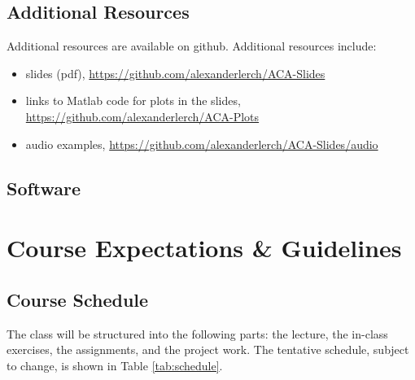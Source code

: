 \documentclass[letterpaper,oneside,10pt]{scrartcl}
\begin{document}
        \subsection{Additional Resources}
            Additional resources are available on github. Additional resources include:
            \begin{itemize}
                \item   slides (pdf), \url{https://github.com/alexanderlerch/ACA-Slides}
                \item   links to Matlab code for plots in the slides, \url{https://github.com/alexanderlerch/ACA-Plots}
                \item   audio examples, \url{https://github.com/alexanderlerch/ACA-Slides/audio}
            \end{itemize}

        \subsection{Software}
             

\section{Course Expectations \& Guidelines}
    \subsection{Course Schedule}\label{sec:outline}
        The class will be structured into the following parts: the lecture, the in-class exercises, the assignments, and the project work. The tentative schedule, subject to change, is shown in Table \ref{tab:schedule}.
        
        \bigskip
        
\end{document}
